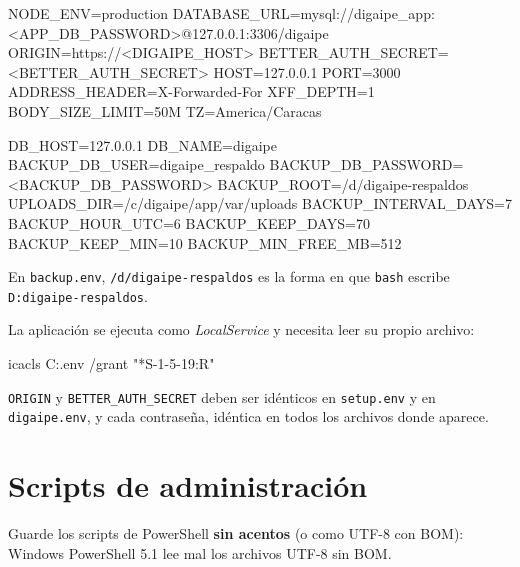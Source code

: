 \begin{codigo}[label={C:\textbackslash digaipe\textbackslash config\textbackslash digaipe.env  (aplicación)}]
NODE_ENV=production
DATABASE_URL=mysql://digaipe_app:<APP_DB_PASSWORD>@127.0.0.1:3306/digaipe
ORIGIN=https://<DIGAIPE_HOST>
BETTER_AUTH_SECRET=<BETTER_AUTH_SECRET>
HOST=127.0.0.1
PORT=3000
ADDRESS_HEADER=X-Forwarded-For
XFF_DEPTH=1
BODY_SIZE_LIMIT=50M
TZ=America/Caracas
\end{codigo}

\begin{codigo}[label={C:\textbackslash digaipe\textbackslash config\textbackslash backup.env  (respaldos; rutas en formato de Git Bash)}]
DB_HOST=127.0.0.1
DB_NAME=digaipe
BACKUP_DB_USER=digaipe_respaldo
BACKUP_DB_PASSWORD=<BACKUP_DB_PASSWORD>
BACKUP_ROOT=/d/digaipe-respaldos
UPLOADS_DIR=/c/digaipe/app/var/uploads
BACKUP_INTERVAL_DAYS=7
BACKUP_HOUR_UTC=6
BACKUP_KEEP_DAYS=70
BACKUP_KEEP_MIN=10
BACKUP_MIN_FREE_MB=512
\end{codigo}

En \texttt{backup.env}, \texttt{/d/digaipe-respaldos} es la forma en que \texttt{bash} escribe
\texttt{D:\bs digaipe-respaldos}.

La aplicación se ejecuta como \emph{LocalService} y necesita leer su propio archivo:

\begin{codigo}
icacls C:\digaipe\config\digaipe.env /grant "*S-1-5-19:R"
\end{codigo}

\begin{aviso}
	\texttt{ORIGIN} y \texttt{BETTER\_AUTH\_SECRET} deben ser idénticos en \texttt{setup.env} y en
	\texttt{digaipe.env}, y cada contraseña, idéntica en todos los archivos donde aparece.
\end{aviso}

\section{Scripts de administración}

Guarde los scripts de PowerShell \textbf{sin acentos} (o como UTF-8 con BOM): Windows
PowerShell 5.1 lee mal los archivos UTF-8 sin BOM.


